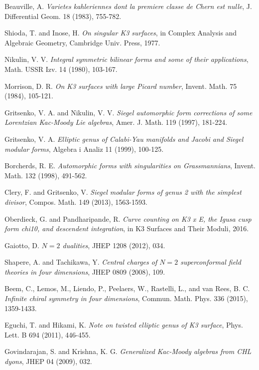 \documentclass[11pt]{article}
\begin{document}
Beauville, A.  \emph{Varietes kahleriennes dont la premiere classe de
Chern est nulle}, J. Differential Geom. 18 (1983), 755-782.

Shioda, T. and Inose, H.  \emph{On singular K3 surfaces}, in Complex
Analysis and Algebraic Geometry, Cambridge Univ. Press, 1977.

Nikulin, V. V.  \emph{Integral symmetric bilinear forms and some of
their applications}, Math. USSR Izv. 14 (1980), 103-167.

Morrison, D. R.  \emph{On K3 surfaces with large Picard number},
Invent. Math. 75 (1984), 105-121.

Gritsenko, V. A. and Nikulin, V. V.  \emph{Siegel automorphic form
corrections of some Lorentzian Kac-Moody Lie algebras}, Amer. J. Math.
119 (1997), 181-224.

Gritsenko, V. A.  \emph{Elliptic genus of Calabi-Yau manifolds and
Jacobi and Siegel modular forms}, Algebra i Analiz 11 (1999), 100-125.

Borcherds, R. E.  \emph{Automorphic forms with singularities on
Grassmannians}, Invent. Math. 132 (1998), 491-562.

Clery, F. and Gritsenko, V.  \emph{Siegel modular forms of genus 2 with
the simplest divisor}, Compos. Math. 149 (2013), 1563-1593.

Oberdieck, G. and Pandharipande, R.  \emph{Curve counting on K3 x E,
the Igusa cusp form chi10, and descendent integration}, in K3 Surfaces
and Their Moduli, 2016.

Gaiotto, D.  \emph{\(N=2\) dualities}, JHEP 1208 (2012), 034.

Shapere, A. and Tachikawa, Y.  \emph{Central charges of \(N=2\)
superconformal field theories in four dimensions}, JHEP 0809 (2008),
109.

Beem, C., Lemos, M., Liendo, P., Peelaers, W., Rastelli, L., and
van Rees, B. C.  \emph{Infinite chiral symmetry in four dimensions},
Commun. Math. Phys. 336 (2015), 1359-1433.

Eguchi, T. and Hikami, K.  \emph{Note on twisted elliptic genus of K3
surface}, Phys. Lett. B 694 (2011), 446-455.

Govindarajan, S. and Krishna, K. G.  \emph{Generalized Kac-Moody
algebras from CHL dyons}, JHEP 04 (2009), 032.
\end{document}
